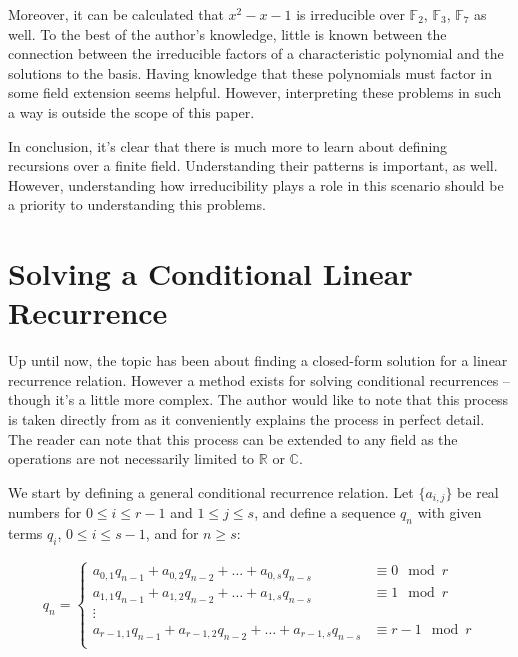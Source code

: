 \documentclass[a4paper]{article}
\theoremstyle{definition}
\begin{document}
Moreover, it can be calculated that $x^2-x-1$ is irreducible over $\mathbb{F}_2$, $\mathbb{F}_3$,
$\mathbb{F}_7$ as well. To the best of the author's knowledge, little is known between the connection
between the irreducible factors of a characteristic polynomial and the solutions to the basis. Having
knowledge that these polynomials must factor in some field extension seems helpful. However,
interpreting these problems in such a way is outside the scope of this paper.

In conclusion, it's clear that there is much more to learn about defining recursions over a finite
field. Understanding their patterns is important, as well. However, understanding how irreducibility
plays a role in this scenario should be a priority to understanding this problems.

\section{Solving a Conditional Linear Recurrence}

Up until now, the topic has been about finding a closed-form solution for a linear recurrence relation.
However a method exists for solving conditional recurrences -- though it's a little more complex. The
author would like to note that this process is taken directly from \cite{bib:gen_cond_rec} as it
conveniently explains the process in perfect detail. The reader can note that this process can be
extended to any field as the operations are not necessarily limited to $\mathbb{R}$ or $\mathbb{C}$.

We start by defining a general conditional recurrence relation. Let $\{a_{i,j}\}$ be real numbers for
$0 \le i \le r-1$ and $1 \le j \le s$, and define a sequence ${q_n}$ with given terms $q_i$,
$0 \le i \le s-1$, and for $n \ge s$:

\begin{align*}
q_n=
\begin{cases}
a_{0,1}q_{n-1}+a_{0,2}q_{n-2}+\ldots+a_{0,s}q_{n-s}       & \equiv 0   \mod r \\
a_{1,1}q_{n-1}+a_{1,2}q_{n-2}+\ldots+a_{1,s}q_{n-s}       & \equiv 1   \mod r \\
\vdots                                                                        \\
a_{r-1,1}q_{n-1}+a_{r-1,2}q_{n-2}+\ldots+a_{r-1,s}q_{n-s} & \equiv r-1 \mod r \\
\end{cases}
\end{align*}
\end{document}

